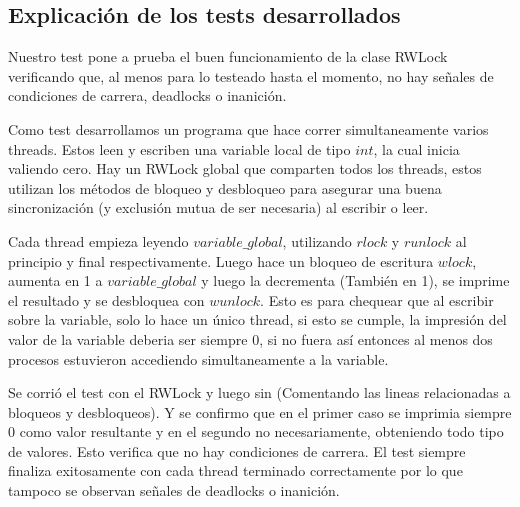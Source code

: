 \subsection{Explicación de los tests desarrollados}

Nuestro test pone a prueba el buen funcionamiento de la clase RWLock verificando que, al menos para lo testeado hasta el momento, no hay señales de condiciones de carrera, deadlocks o inanición. 

Como test desarrollamos un programa que hace correr simultaneamente varios threads. Estos leen y escriben una variable local de tipo $int$, la cual inicia valiendo cero. Hay un RWLock global que comparten todos los threads, estos utilizan los métodos de bloqueo y desbloqueo para asegurar una buena sincronización (y exclusión mutua de ser necesaria) al escribir o leer.

Cada thread empieza leyendo $variable\_global$, utilizando $rlock$ y $runlock$ al principio y final respectivamente. Luego hace un bloqueo de escritura $wlock$, aumenta en 1 a $variable\_global$ y luego la decrementa (También en 1), se imprime el resultado y se desbloquea con $wunlock$. Esto es para chequear que al escribir sobre la variable, solo lo hace un único thread, si esto se cumple, la impresión del valor de la variable deberia ser siempre $0$, si no fuera así entonces al menos dos procesos estuvieron accediendo simultaneamente a la variable.

Se corrió el test con el RWLock y luego sin (Comentando las lineas relacionadas a bloqueos y desbloqueos). Y se confirmo que en el primer caso se imprimia siempre 0 como valor resultante y en el segundo no necesariamente, obteniendo todo tipo de valores. Esto verifica que no hay condiciones de carrera. El test siempre finaliza exitosamente con cada thread terminado correctamente por lo que tampoco se observan señales de deadlocks o inanición.